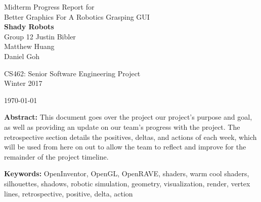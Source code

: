 \documentclass[10pt,journal,compsoc,draftclsnofoot]{IEEEtran}
\begin{document}
\onecolumn

\begin{titlepage}
\null
\vspace{15mm}

\begin{flushleft}
\begin{bfseries}
	\vskip2mm
	\Huge{Midterm Progress Report for\\ Better Graphics For A Robotics Grasping GUI}\\
	\vspace{15mm}
	\textbf{\huge Shady Robots} \\
	\vskip2mm
	\large{Group 12}
	\vskip5mm
	\Large{Justin Bibler \\
	Matthew Huang \\
	Daniel Goh \\}
\end{bfseries}

\vspace{15mm}
\Large{CS462: Senior Software Engineering Project} \\
\Large{Winter 2017} \\

\vspace{5mm}

\today

\vfill

\begin{normalsize}
{\bf Abstract:}
This document goes over the project our project's purpose and goal, as well as providing an update on our team's progress with the project.
The retrospective section details the positives, deltas, and actions of each week, which will be used from here on out to allow the team to reflect and improve for the remainder of the project timeline.

{\bf Keywords:} OpenInventor, OpenGL, OpenRAVE, shaders, warm cool shaders, silhouettes, shadows, robotic simulation, geometry, visualization, render, vertex lines, retrospective, positive, delta, action
\end{normalsize}
\end{flushleft}

\newpage

\end{titlepage}
\end{document}
